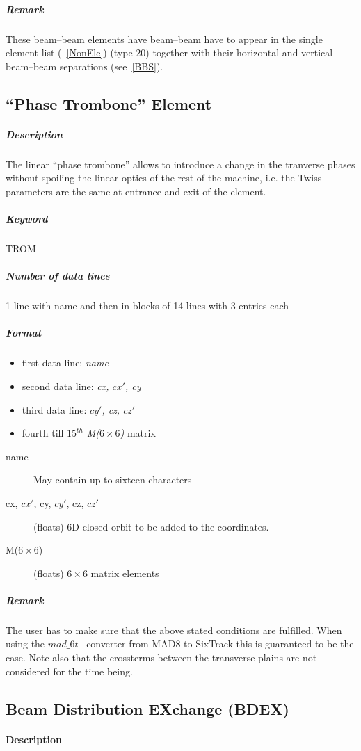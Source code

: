 \documentclass[a4paper,11pt]{report}
\begin{document}
\subparagraph{Remark} These beam--beam elements have beam--beam have
to appear in the single element list (~\ref{NonEle}) (type 20) together
with their horizontal and vertical beam--beam separations
(see~\ref{BBS}).

\subsection{``Phase Trombone'' Element} \label{Trombone}

\subparagraph{Description} The linear ``phase trombone'' allows to
introduce a change in the tranverse phases without spoiling the linear
optics of the rest of the machine, i.e. the Twiss parameters are the
same at entrance and exit of the element.  
\subparagraph{Keyword} TROM
\subparagraph{Number of data lines} 1 line with name and then in
blocks of 14 lines with 3 entries each

\subparagraph{Format} 
\begin{itemize}
\item first data line: {\em name}
\item second data line: {\em cx, $cx'$, cy}
\item third data line: {\em $cy'$, cz, $cz'$}
\item fourth till $15^{th}$ {\em M($ 6 \times 6$)} matrix 
\end{itemize}

\begin{description}
\item [name] May contain up to sixteen characters
\item [cx, $cx'$, cy, $cy'$, cz, $cz'$] (floats) 6D closed orbit to be added
  to the coordinates.
\item [M($ 6 \times 6$)] (floats) $ 6 \times 6$ matrix elements
\end{description}

\subparagraph{Remark} The user has to make sure that the above stated
conditions are fulfilled. When using the $mad\_6t$~\cite{CONVERTOR}
converter from MAD8 to SixTrack this is guaranteed to be the case. Note
also that the crossterms between the transverse plains are not
considered for the time being.

\subsection{Beam Distribution EXchange (BDEX)}
\label{sec:BDEX}

\paragraph{Description}
\end{document}
